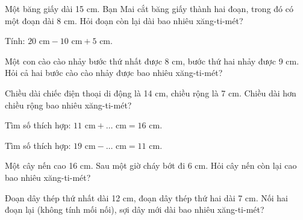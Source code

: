 \begin{ex}
Một băng giấy dài 15 cm. Bạn Mai cắt băng giấy thành hai đoạn, trong đó có một đoạn dài 8 cm. Hỏi đoạn còn lại dài bao nhiêu xăng-ti-mét?
\end{ex}

\begin{ex}
Tính: $20\text{ cm} - 10\text{ cm} + 5\text{ cm}$.
\end{ex}

\begin{ex}
Một con cào cào nhảy bước thứ nhất được 8 cm, bước thứ hai nhảy được 9 cm. Hỏi cả hai bước cào cào nhảy được bao nhiêu xăng-ti-mét?
\end{ex}

\begin{ex}
Chiều dài chiếc điện thoại di động là 14 cm, chiều rộng là 7 cm. Chiều dài hơn chiều rộng bao nhiêu xăng-ti-mét?
\end{ex}

\begin{ex}
Tìm số thích hợp: $11\text{ cm} + \dots\text{ cm} = 16\text{ cm}$.
\end{ex}

\begin{ex}
Tìm số thích hợp: $19\text{ cm} - \dots\text{ cm} = 11\text{ cm}$.
\end{ex}

\begin{ex}
Một cây nến cao 16 cm. Sau một giờ cháy bớt đi 6 cm. Hỏi cây nến còn lại cao bao nhiêu xăng-ti-mét?
\end{ex}

\begin{ex}
Đoạn dây thép thứ nhất dài 12 cm, đoạn dây thép thứ hai dài 7 cm. Nối hai đoạn lại (không tính mối nối), sợi dây mới dài bao nhiêu xăng-ti-mét?
\end{ex}

